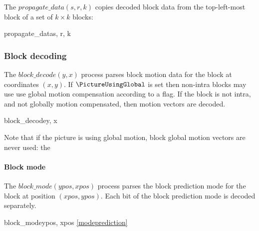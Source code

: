 The $propagate\_data(s, r, k)$ copies decoded block data from the top-left-most block
of a set of $k\times k$ blocks:

\begin{pseudo}{propagate\_data}{s, r, k}
        \bsCODE{\BlockData[j][i]=\BlockData[s][r]}
    \bsEND
\bsEND
\end{pseudo}

\subsubsection{Block decoding}
\label{blockdecoding}

The $block\_decode(y, x)$ process parses block motion data for the block at coordinates $(x, y)$. If $\PictureUsingGlobal$ is set
then non-intra blocks may use use global motion compensation according to a flag.
If the block is not intra, and not globally motion compensated, then motion vectors are decoded.

\begin{pseudo}{block\_decode}{y, x}
\bsIF{\BlockData[y][x][mode]==\Intra}
    \bsCODE{\BlockData[y][x][global]=\false}
\bsELSE
    \bsIF{\PictureUsingGlobal==\true}
    \bsELSE
        \bsCODE{\BlockData[y][x][global]=\false}
    \bsEND

    \bsIF{\BlockData[y][x][global]=\false}
    \bsEND
\end{pseudo}

\begin{informative}
Note that if the picture is using global motion, block global motion vectors are never used: the
\end{informative}

\paragraph{Block mode \\}
\label{blockmode}

The $block\_mode(ypos,xpos)$ process parses the block prediction mode for the block at position $(xpos, ypos)$. Each
bit of the block prediction mode is decoded separately.

\begin{pseudo}{block\_mode}{ypos, xpos}
     {\ref{modeprediction}}
\bsEND
\end{pseudo}

